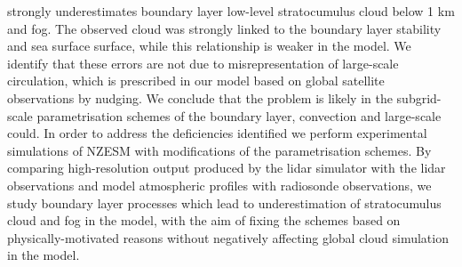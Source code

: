 strongly underestimates boundary layer low-level stratocumulus cloud below
1 km and fog. The observed cloud was strongly linked to the boundary layer
stability and sea surface surface, while this relationship is weaker in the
model. We identify that these errors are not due to misrepresentation of
large-scale circulation, which is prescribed in our model based on global
satellite observations by nudging. We conclude that the problem is likely in
the subgrid-scale parametrisation schemes of the boundary layer, convection
and large-scale could. In order to address the deficiencies identified we
perform experimental simulations of NZESM with modifications of the
parametrisation schemes. By comparing high-resolution output produced by
the lidar simulator with the lidar observations and model atmospheric
profiles with radiosonde observations, we study boundary layer processes
which lead to underestimation of stratocumulus cloud and fog in the model,
with the aim of fixing the schemes based on physically-motivated reasons
without negatively affecting global cloud simulation in the model.
